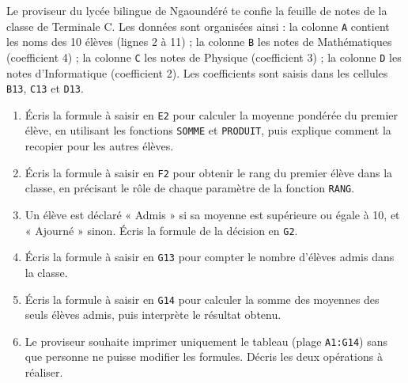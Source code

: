 \documentclass[11pt]{article}
\newcounter{popsec}
\newcounter{popsub}
\newcommand{\courssub}[1]{%
  \stepcounter{popsub}%
  \par\vspace{9pt}\noindent{\popxbold\fontsize{11.5}{13}\selectfont\color{popink}{\color{poporange}\thepopsec.\thepopsub}\hspace{6pt}#1}\par\nopagebreak\vspace{4pt}
}
\begin{document}
\courssub{Je me prépare au Bac}

\begin{exercice}
Le proviseur du lycée bilingue de Ngaoundéré te confie la feuille de notes de la classe de Terminale C. Les données sont organisées ainsi : la colonne \texttt{A} contient les noms des 10 élèves (lignes 2 à 11) ; la colonne \texttt{B} les notes de Mathématiques (coefficient 4) ; la colonne \texttt{C} les notes de Physique (coefficient 3) ; la colonne \texttt{D} les notes d'Informatique (coefficient 2). Les coefficients sont saisis dans les cellules \texttt{B13}, \texttt{C13} et \texttt{D13}.
\begin{enumerate}
\item Écris la formule à saisir en \texttt{E2} pour calculer la moyenne pondérée du premier élève, en utilisant les fonctions \texttt{SOMME} et \texttt{PRODUIT}, puis explique comment la recopier pour les autres élèves.
\item Écris la formule à saisir en \texttt{F2} pour obtenir le rang du premier élève dans la classe, en précisant le rôle de chaque paramètre de la fonction \texttt{RANG}.
\item Un élève est déclaré « Admis » si sa moyenne est supérieure ou égale à 10, et « Ajourné » sinon. Écris la formule de la décision en \texttt{G2}.
\item Écris la formule à saisir en \texttt{G13} pour compter le nombre d'élèves admis dans la classe.
\item Écris la formule à saisir en \texttt{G14} pour calculer la somme des moyennes des seuls élèves admis, puis interprète le résultat obtenu.
\item Le proviseur souhaite imprimer uniquement le tableau (plage \texttt{A1:G14}) sans que personne ne puisse modifier les formules. Décris les deux opérations à réaliser.
\end{enumerate}
\end{exercice}
\end{document}
